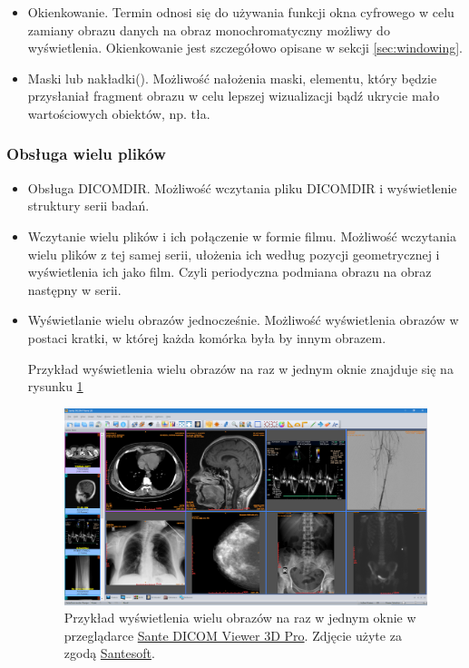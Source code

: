 \begin{itemize}
    \item Okienkowanie.
          Termin odnosi się do używania funkcji okna cyfrowego w celu zamiany obrazu danych na obraz monochromatyczny możliwy do wyświetlenia.
          Okienkowanie jest szczegółowo opisane w sekcji \ref{sec:windowing}.

    \item Maski lub nakładki().
          Możliwość nałożenia maski, elementu, który będzie przysłaniał fragment obrazu w celu lepszej wizualizacji bądź ukrycie mało wartościowych obiektów, np. tła.
\end{itemize}

\subsubsection{Obsługa wielu plików}

\begin{itemize}

    \item Obsługa DICOMDIR.
          Możliwość wczytania pliku DICOMDIR i wyświetlenie struktury serii badań.

    \item Wczytanie wielu plików i ich połączenie w formie filmu.
          Możliwość wczytania wielu plików z tej samej serii, ułożenia ich według pozycji geometrycznej i wyświetlenia ich jako film.
          Czyli periodyczna podmiana obrazu na obraz następny w serii.

    \item Wyświetlanie wielu obrazów jednocześnie.
          Możliwość wyświetlenia obrazów w postaci kratki, w której każda komórka była by innym obrazem.

          Przykład wyświetlenia wielu obrazów na raz w jednym oknie znajduje się na rysunku \ref{fig:dicomviewer001}

          \begin{figure}[!htbp]
              \centering
              \includegraphics[width=\textwidth]{img/dicom-viewer-001.png}
              \caption{Przykład wyświetlenia wielu obrazów na raz w jednym oknie w przeglądarce \href{https://www.santesoft.com/win/sante-dicom-viewer-3d-pro/sante-dicom-viewer-3d-pro.html}{Sante DICOM Viewer 3D Pro}. Zdjęcie użyte za zgodą \href{https://www.santesoft.com/}{Santesoft}.}
              \label{fig:dicomviewer001}
          \end{figure}
\end{itemize}

